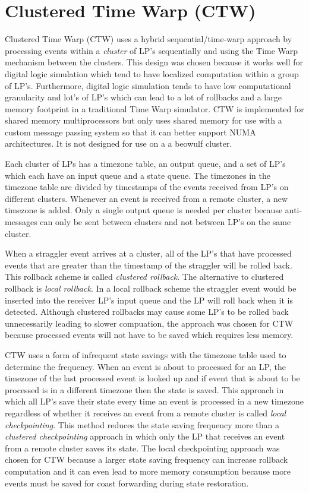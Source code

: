 \documentclass[11pt]{book}
\begin{document}
\section{Clustered Time Warp (CTW)}

Clustered Time Warp\cite{avril-95} (CTW) uses a hybrid sequential/time-warp approach by processing
events within a \emph{cluster} of LP's sequentially and using the Time Warp mechanism between
the clusters.  This design was chosen because it works well for digital logic simulation which tend
to have localized computation within a group of LP's.  Furthermore, digital logic simulation tends
to have low computational granularity and lot's of LP's which can lead to a lot of rollbacks
and a large memory footprint in a traditional Time Warp simulator.  CTW is implemented for
shared memory multiprocessors but only uses shared memory for use with a custom message passing
system so that it can better support NUMA architectures.  It is not designed for use on a
a beowulf cluster.

Each cluster of LPs has a timezone table, an output queue, and a set of LP's which each have an
input queue and a state queue.  The timezones in the timezone table are divided by timestamps
of the events received from LP's on different clusters.  Whenever an event is received from
a remote cluster, a new timezone is added.  Only a single output queue is needed per cluster
because anti-messages can only be sent between clusters and not between LP's on the same
cluster.

When a straggler event arrives at a cluster, all of the LP's that have processed events that
are greater than the timestamp of the straggler will be rolled back.  This rollback scheme is
called \emph{clustered rollback}.  The alternative to clustered rollback is \emph{local
rollback}.  In a local rollback scheme the straggler event would be inserted into the receiver
LP's input queue and the LP will roll back when it is detected.  Although clustered rollbacks
may cause some LP's to be rolled back unnecessarily leading to slower compuation, the
approach was chosen for CTW because processed events will not have to be saved which
requires less memory.

CTW uses a form of infrequent state savings with the timezone table used to determine the
frequency.  When an event is about to processed for an LP, the timezone of the last processed
event is looked up and if event that is about to be processed is in a different timezone then
the state is saved.  This approach in which all LP's save their state every time an event is
processed in a new timezone regardless of whether it receives an event from a remote cluster
is called \emph{local checkpointing}.  This method reduces the state saving frequency more
than a \emph{clustered checkpointing} approach in which only the LP that receives an event
from a remote cluster saves its state.  The local checkpointing approach was chosen for CTW
because a larger state saving frequency can increase rollback computation and it can even
lead to more memory consumption because more events must be saved for coast forwarding
during state restoration.
\end{document}
